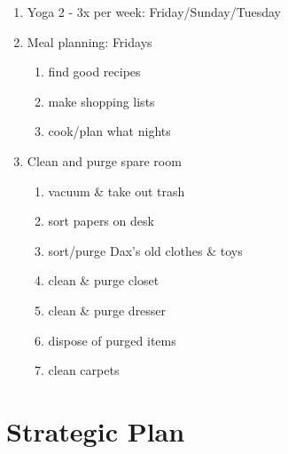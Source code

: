 \documentclass[]{article}
\providecommand{\tightlist}{%
  \setlength{\itemsep}{0pt}\setlength{\parskip}{0pt}}
\begin{document}
\begin{enumerate}
\def\labelenumi{\arabic{enumi}.}
\tightlist
\item
  Yoga 2 - 3x per week: Friday/Sunday/Tuesday
\item
  Meal planning: Fridays

  \begin{enumerate}
  \def\labelenumii{\roman{enumii})}
  \tightlist
  \item
    find good recipes
  \item
    make shopping lists
  \item
    cook/plan what nights
  \end{enumerate}
\item
  Clean and purge spare room

  \begin{enumerate}
  \def\labelenumii{\roman{enumii})}
  \tightlist
  \item
    vacuum \& take out trash
  \item
    sort papers on desk
  \item
    sort/purge Dax's old clothes \& toys
  \item
    clean \& purge closet
  \item
    clean \& purge dresser
  \item
    dispose of purged items
  \item
    clean carpets
  \end{enumerate}
\end{enumerate}

\newpage

\section{Strategic Plan}\label{strategic-plan}
\end{document}
